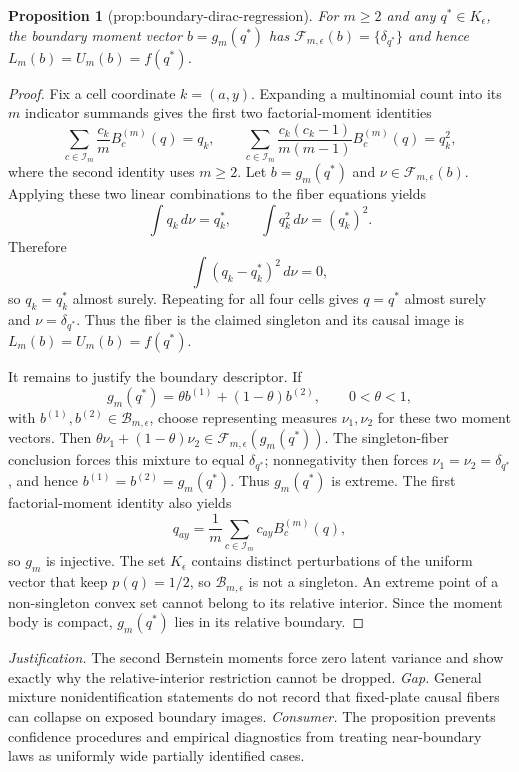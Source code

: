 \documentclass{article}
\newtheorem{proposition}{Proposition}
\begin{document}
\begin{proposition}[prop:boundary-dirac-regression]\label{prop:boundary-dirac-regression}
For \(m\ge2\) and any \(q^*\in K_{\epsilon}\), the boundary moment vector \(b=g_m(q^*)\) has \(\mathcal F_{m,\epsilon}(b)=\{\delta_{q^*}\}\) and hence \(L_m(b)=U_m(b)=f(q^*)\).
\end{proposition}
\begin{proof}
Fix a cell coordinate \(k=(a,y)\).  Expanding a multinomial count into its \(m\) indicator summands gives the first two factorial-moment identities
\[
 \sum_{c\in\mathcal I_m}\frac{c_k}{m}B_c^{(m)}(q)=q_k,
 \qquad
 \sum_{c\in\mathcal I_m}\frac{c_k(c_k-1)}{m(m-1)}B_c^{(m)}(q)=q_k^2,
\]
where the second identity uses \(m\geq2\).  Let \(b=g_m(q^*)\) and \(\nu\in\mathcal F_{m,\epsilon}(b)\).  Applying these two linear combinations to the fiber equations yields
\[
 \int q_k\,d\nu=q_k^*,
 \qquad
 \int q_k^2\,d\nu=(q_k^*)^2.
\]
Therefore
\[
 \int(q_k-q_k^*)^2\,d\nu=0,
\]
so \(q_k=q_k^*\) almost surely.  Repeating for all four cells gives \(q=q^*\) almost surely and \(\nu=\delta_{q^*}\).  Thus the fiber is the claimed singleton and its causal image is \(L_m(b)=U_m(b)=f(q^*)\).

It remains to justify the boundary descriptor.  If
\[
 g_m(q^*)=\theta b^{(1)}+(1-\theta)b^{(2)},\qquad 0<\theta<1,
\]
with \(b^{(1)},b^{(2)}\in\mathcal B_{m,\epsilon}\), choose representing measures
\(\nu_1,\nu_2\) for these two moment vectors.  Then
\(\theta\nu_1+(1-\theta)\nu_2\in\mathcal F_{m,\epsilon}(g_m(q^*))\).
The singleton-fiber conclusion forces this mixture to equal \(\delta_{q^*}\);
nonnegativity then forces \(\nu_1=\nu_2=\delta_{q^*}\), and hence
\(b^{(1)}=b^{(2)}=g_m(q^*)\).  Thus \(g_m(q^*)\) is extreme.  The first
factorial-moment identity also yields
\[
 q_{ay}=\frac1m\sum_{c\in\mathcal I_m}c_{ay}B_c^{(m)}(q),
\]
so \(g_m\) is injective.  The set \(K_{\epsilon}\) contains distinct
perturbations of the uniform vector that keep \(p(q)=1/2\), so
\(\mathcal B_{m,\epsilon}\) is not a singleton.  An extreme point of a
non-singleton convex set cannot belong to its relative interior.  Since the
moment body is compact, \(g_m(q^*)\) lies in its relative boundary.
\end{proof}
\par\smallskip\noindent \textit{Justification.} The second Bernstein moments force zero latent variance and show exactly why the relative-interior restriction cannot be dropped. \textit{Gap.} General mixture nonidentification statements do not record that fixed-plate causal fibers can collapse on exposed boundary images. \textit{Consumer.} The proposition prevents confidence procedures and empirical diagnostics from treating near-boundary laws as uniformly wide partially identified cases.
\end{document}
